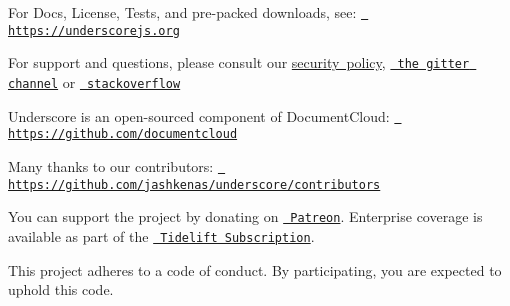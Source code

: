 For Docs, License, Tests, and pre-\/packed downloads, see\+: \href{https://underscorejs.org}{\texttt{ https\+://underscorejs.\+org}}

For support and questions, please consult our \mbox{\hyperlink{SECURITY_8md}{security policy}}, \href{https://gitter.im/jashkenas/underscore}{\texttt{ the gitter channel}} or \href{https://stackoverflow.com/search?q=underscore.js}{\texttt{ stackoverflow}}

Underscore is an open-\/sourced component of Document\+Cloud\+: \href{https://github.com/documentcloud}{\texttt{ https\+://github.\+com/documentcloud}}

Many thanks to our contributors\+: \href{https://github.com/jashkenas/underscore/contributors}{\texttt{ https\+://github.\+com/jashkenas/underscore/contributors}}

You can support the project by donating on \href{https://patreon.com/juliangonggrijp}{\texttt{ Patreon}}. Enterprise coverage is available as part of the \href{https://tidelift.com/subscription/pkg/npm-underscore?utm_source=npm-underscore&utm_medium=referral&utm_campaign=enterprise}{\texttt{ Tidelift Subscription}}.

This project adheres to a code of conduct. By participating, you are expected to uphold this code. 